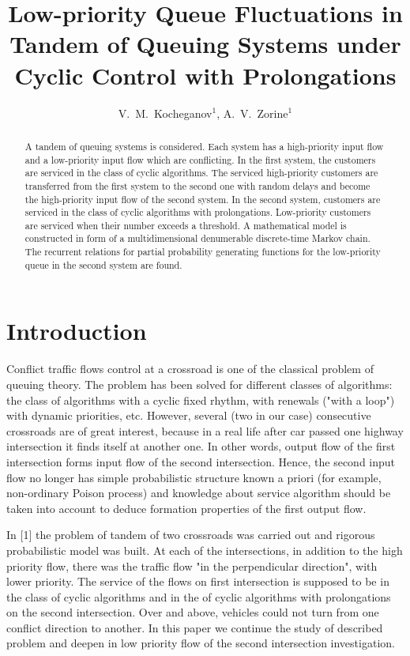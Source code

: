 \documentclass[10pt]{article}
\title{Low-priority Queue Fluctuations in Tandem of Queuing Systems under Cyclic Control with Prolongations}
\author{V.~M.~Kocheganov$^1$, A.~V.~Zorine$^1$}
\begin{document}
\maketitle

\begin{abstract}
A tandem of queuing systems is considered. Each system has a high-priority input flow and a low-priority input flow which are conflicting. In the first system, the customers are serviced in the class of cyclic algorithms. The serviced high-priority customers are transferred from the first system to the second one  with random delays and become the high-priority input flow of the second system. In the second system, customers are serviced in the class of cyclic algorithms with prolongations. Low-priority customers are serviced when their number exceeds a threshold. A mathematical model is constructed in form of a multidimensional denumerable discrete-time Markov chain. The recurrent relations for partial probability generating functions for the low-priority queue in the second system are found.

\end{abstract}


\section{Introduction}
Conflict traffic flows control at a crossroad is one of the classical problem of queuing theory. The problem has been solved for different classes of algorithms: the class of algorithms with a cyclic fixed rhythm, with renewals ("with a loop") with dynamic priorities, etc. However, several (two in our case) consecutive crossroads are of great interest, because in a real life after car passed one highway intersection it finds itself at another one. In other words, output flow of the first intersection forms input flow of the second intersection. Hence, the second input flow no longer has simple probabilistic structure known a priori (for example, non-ordinary Poison process) and knowledge about service algorithm should be taken into account to deduce formation properties of the first output flow.

In [1] the problem of tandem of two crossroads was carried out and rigorous probabilistic model was built. At each of the intersections, in addition to the high priority flow, there was the traffic flow "in the perpendicular direction", with lower priority. The service of the flows on first intersection is supposed to be in the class of cyclic algorithms and in the of cyclic algorithms with prolongations on the second intersection. Over and above, vehicles could not turn from one conflict direction to another. In this paper we continue the study of described problem and deepen in low priority flow of the second intersection investigation.
\end{document}
